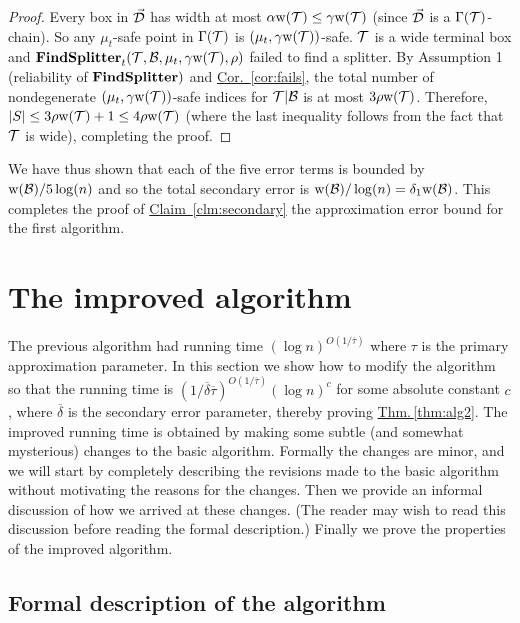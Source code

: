 \documentclass{acmsmall}
\newcommand{\cB}{{\cal B}}
\newcommand{\cD}{{\cal D}}
\newcommand{\cT}{{\cal T}}
\newcommand{\Thm}[1]{\hyperref[thm:#1]{Thm.\,\ref*{thm:#1}}} %
\newcommand{\Cor}[1]{\hyperref[cor:#1]{Cor.~\ref*{cor:#1}}} %
\newcommand{\Clm}[1]{\hyperref[clm:#1]{Claim~\ref*{clm:#1}}} %
\newcommand{\deltapar}{\overline{\delta}}
\newcommand{\err}{\xi}
\newcommand{\taupar}{\overline{\tau}}
\newcommand{\strip}[2]{#1|#2}
\newcommand{\width}{{\bf {\rm  w}}}
\newcommand{\gridprec}{\alpha}
\newcommand{\findsplitter}{{\rm {\bf FindSplitter}}}
\begin{document}
\begin{proof}
Every box in $\vec{\cD}$ has
width at most $\gridprec \width(\cT) \leq \gamma \width(\cT)$ (since $\vec{\cD}$ is a $\Gamma(\cT)$-chain).
So any $\mu_t$-safe point in $\Gamma(\cT)$ is $(\mu_t,\gamma \width(\cT))$-safe.  $\cT$ is a wide terminal box and
$\findsplitter_t(\cT,\cB,\mu_t,\gamma \width(\cT), \rho)$ failed to find a splitter. By Assumption 1 (reliability of $\findsplitter)$
and \Cor{fails}, the total number of nondegenerate $(\mu_t,\gamma\width(\cT))$-safe indices for $\strip{\cT}{\cB}$
is at most $3\rho\width(\cT)$.  Therefore, $|S| \leq 3\rho\width(\cT) + 1 \leq 4\rho\width(\cT)$ (where the last
inequality follows from the fact that $\cT$ is wide), completing the proof.
%
\end{proof}

We have thus shown that each of the five error terms is bounded by $\width(\cB)/5\log(n)$ and so the
total secondary error is $\width(\cB)/\log(n)=\delta_1 \width(\cB)$.  
This completes the proof of \Clm{secondary} the approximation error bound for the first algorithm.


\section{The improved algorithm}
\label{sec:improved}

The previous algorithm had running time $(\log n)^{O(1/\taupar)}$ where $\tau$ is the primary approximation
parameter.  
In this section we show how to modify the algorithm so that the running time is
$(1/\deltapar\taupar)^{O(1/\taupar)} (\log n)^{c}$ for some absolute constant $c$, where $\deltapar$ is the secondary error parameter, thereby proving \Thm{alg2}.   
The improved running time is obtained by making some subtle (and somewhat mysterious) changes to the
basic algorithm.  Formally the changes are  minor, and we will start by completely describing the revisions made to the
basic algorithm without
motivating the reasons for the changes.  Then we provide an informal discussion of how we arrived at these
changes.  (The reader may wish to read this discussion before reading the formal description.) 
Finally we prove the properties of the improved algorithm.

\subsection{Formal description of the algorithm}
\label{sec:improve-alg}
\end{document}
